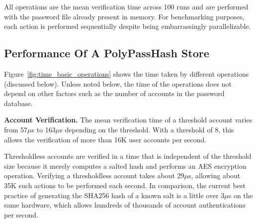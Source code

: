 %

All operations are the mean verification time across 100 runs and
are performed with the password file already present in
memory.  
For benchmarking purposes, each action is performed sequentially despite being 
embarrassingly parallelizable.


\subsection{Performance Of A PolyPassHash Store}

Figure~\ref{fig:time_basic_operations} shows the time taken by
different operations (discussed below).  Unless noted below,
the time of the operations does not depend on other factors such as the 
number of accounts in the password database.




{\bf Account Verification.}
The mean verification time of a threshold account
varies from 57$\mu$s to 163$\mu$s depending on the
threshold.  With a threshold of 8, this allows the verification of 
more than 16K user accounts per second.

Thresholdless accounts are verified in a time that is independent
of the threshold size because it merely computes    
a salted hash and performs an AES encryption operation.
Verifying
a thresholdless account takes about 29$\mu$s, allowing
about 35K such actions to be performed each second.   
In comparison, the current
best practice of generating the SHA256 hash of a known salt is a little over
3$\mu$s on the same hardware, which allows hundreds of thousands of
account authentications per second.   



